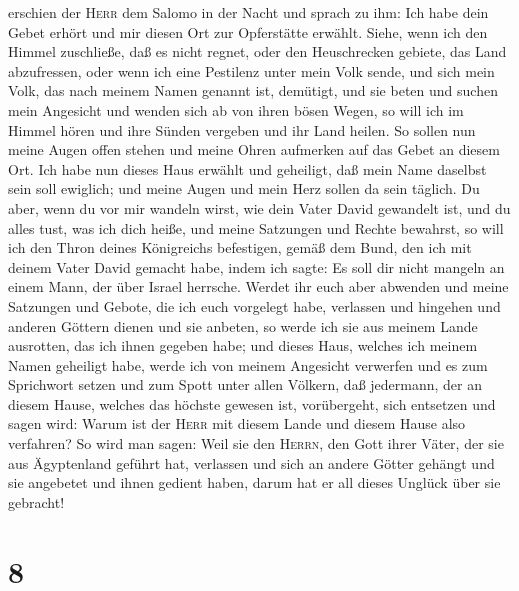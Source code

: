 erschien der \textsc{Herr} dem Salomo in der Nacht und sprach zu ihm:
Ich habe dein Gebet erhört und mir diesen Ort zur Opferstätte erwählt.
 Siehe, wenn ich den Himmel zuschließe, daß es nicht
regnet, oder den Heuschrecken gebiete, das Land abzufressen, oder wenn
ich eine Pestilenz unter mein Volk sende,  und sich mein
Volk, das nach meinem Namen genannt ist, demütigt, und sie beten und
suchen mein Angesicht und wenden sich ab von ihren bösen Wegen, so will
ich im Himmel hören und ihre Sünden vergeben und ihr Land heilen.
 So sollen nun meine Augen offen stehen und meine Ohren
aufmerken auf das Gebet an diesem Ort.  Ich habe nun
dieses Haus erwählt und geheiligt, daß mein Name daselbst sein soll
ewiglich; und meine Augen und mein Herz sollen da sein täglich.
 Du aber, wenn du vor mir wandeln wirst, wie dein Vater
David gewandelt ist, und du alles tust, was ich dich heiße, und meine
Satzungen und Rechte bewahrst,  so will ich den Thron
deines Königreichs befestigen, gemäß dem Bund, den ich mit deinem Vater
David gemacht habe, indem ich sagte: Es soll dir nicht mangeln an einem
Mann, der über Israel herrsche.  Werdet ihr euch aber
abwenden und meine Satzungen und Gebote, die ich euch vorgelegt habe,
verlassen und hingehen und anderen Göttern dienen und sie anbeten,
 so werde ich sie aus meinem Lande ausrotten, das ich
ihnen gegeben habe; und dieses Haus, welches ich meinem Namen geheiligt
habe, werde ich von meinem Angesicht verwerfen und es zum Sprichwort
setzen und zum Spott unter allen Völkern,  daß jedermann,
der an diesem Hause, welches das höchste gewesen ist, vorübergeht, sich
entsetzen und sagen wird: Warum ist der \textsc{Herr} mit diesem Lande
und diesem Hause also verfahren?  So wird man sagen: Weil
sie den \textsc{Herrn}, den Gott ihrer Väter, der sie aus Ägyptenland
geführt hat, verlassen und sich an andere Götter gehängt und sie
angebetet und ihnen gedient haben, darum hat er all dieses Unglück über
sie gebracht!

\hypertarget{section-7}{%
\section{8}\label{section-7}}

